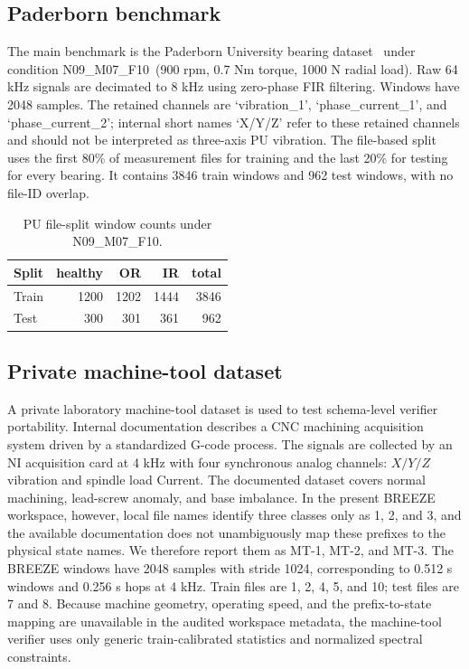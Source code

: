 \documentclass[review,3p,times]{elsarticle}
\newcommand{\pucond}{N09\_M07\_F10}
\begin{document}
\subsection{Paderborn benchmark}

The main benchmark is the Paderborn University bearing dataset~\cite{lessmeier}
under condition \pucond\ (900 rpm, 0.7 Nm torque, 1000 N radial load). Raw
64 kHz signals are decimated to 8 kHz using zero-phase FIR filtering. Windows
have 2048 samples. The retained channels are `vibration\_1',
`phase\_current\_1', and `phase\_current\_2'; internal short names
`X/Y/Z' refer to these retained channels and should not be interpreted as
three-axis PU vibration. The file-based split uses the first 80\% of
measurement files for training and the last 20\% for testing for every
bearing. It contains 3846 train windows and 962 test windows, with no file-ID
overlap.

\begin{table}[H]
\centering
\caption{PU file-split window counts under \pucond.}
\label{tab:pu_split}
\begin{tabular}{lrrrr}
\toprule
Split & healthy & OR & IR & total \\
\midrule
Train & 1200 & 1202 & 1444 & 3846 \\
Test  & 300  & 301  & 361  & 962 \\
\bottomrule
\end{tabular}
\end{table}

\subsection{Private machine-tool dataset}

A private laboratory machine-tool dataset is used to test schema-level
verifier portability.
Internal documentation describes a CNC machining acquisition system driven by a
standardized G-code process. The signals are collected by an NI acquisition card
at 4 kHz with four synchronous analog channels: $X/Y/Z$ vibration and spindle
load Current. The documented dataset covers normal machining, lead-screw
anomaly, and base imbalance. In the present BREEZE workspace, however, local
file names identify three classes only as 1, 2, and 3, and the available
documentation does not unambiguously map these prefixes to the physical state
names. We therefore report them as MT-1, MT-2, and MT-3. The BREEZE windows
have 2048 samples with stride 1024, corresponding to 0.512 s windows and
0.256 s hops at 4 kHz. Train files are 1, 2, 4, 5, and 10; test files are 7
and 8. Because machine geometry, operating speed, and the prefix-to-state
mapping are unavailable in the audited workspace metadata, the machine-tool
verifier uses only generic train-calibrated statistics and normalized spectral
constraints.
\end{document}
